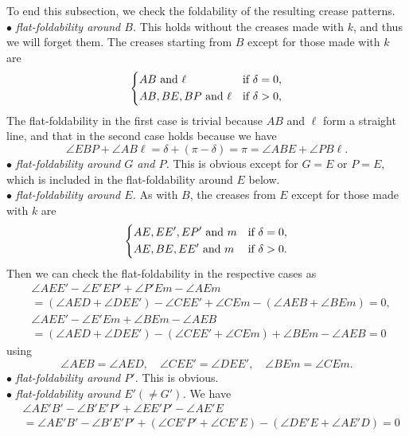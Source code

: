 \documentclass[11pt]{amsart}
\numberwithin{equation}{section}
\numberwithin{theorem}{section}
\begin{document}
To end this subsection, we check the foldability of the resulting crease patterns.\\
$\bullet$ \emph{flat-foldability around $B$. }
This holds without the creases made with $k$, and thus we will forget them.
The creases starting from $B$ except for those made with $k$ are
\begin{equation*}
\begin{dcases}
AB\text{ and }\ell&\text{if }\delta =0,\\
AB ,BE ,BP\text{ and }\ell&\text{if }\delta >0,
\end{dcases}
\end{equation*}
The flat-foldability in the first case is trivial because $AB$ and $\ell$ form a straight line,
and that in the second case holds because we have
\begin{equation*}
\angle EBP+\angle AB\ell =\delta +(\pi -\delta )=\pi =\angle ABE+\angle PB\ell .
\end{equation*}
$\bullet$ \emph{flat-foldability around $G$ and $P$. }
This is obvious except for $G=E$ or $P=E$, which is included in the flat-foldability around $E$ below.\\
$\bullet$ \emph{flat-foldability around $E$. }
As with $B$, the creases from $E$ except for those made with $k$ are
\begin{equation*}
\begin{dcases}
AE ,EE', EP'\text{ and }m&\text{if }\delta =0,\\
AE ,BE ,EE'\text{ and }m&\text{if }\delta >0.
\end{dcases}
\end{equation*}
Then we can check the flat-foldability in the respective cases as
\begin{align*}
&\angle AEE'-\angle E'EP'+\angle P'Em-\angle AEm\\
&=(\angle AED+\angle DEE')-\angle CEE'+\angle CEm-(\angle AEB+\angle BEm)=0,\\
&\angle AEE'-\angle E'Em+\angle BEm-\angle AE B\\
&=(\angle AED+\angle DEE')-(\angle CEE'+\angle CEm)+\angle BEm-\angle AEB=0
\end{align*}
using 
\begin{equation*}
\angle AEB=\angle AED,\quad\angle CEE'=\angle DEE',\quad\angle BEm=\angle CEm.
\end{equation*}
$\bullet$ \emph{flat-foldability around $P'$. }This is obvious.\\
$\bullet$ \emph{flat-foldability around $E'(\neq G')$. }We have
\begin{align*}
&\angle AE'B'-\angle B'E'P'+\angle EE'P'-\angle AE'E\\
&=\angle AE'B'-\angle B'E'P'+(\angle CE'P'+\angle CE'E)-(\angle DE'E+\angle AE'D)=0
\end{align*}
\end{document}

